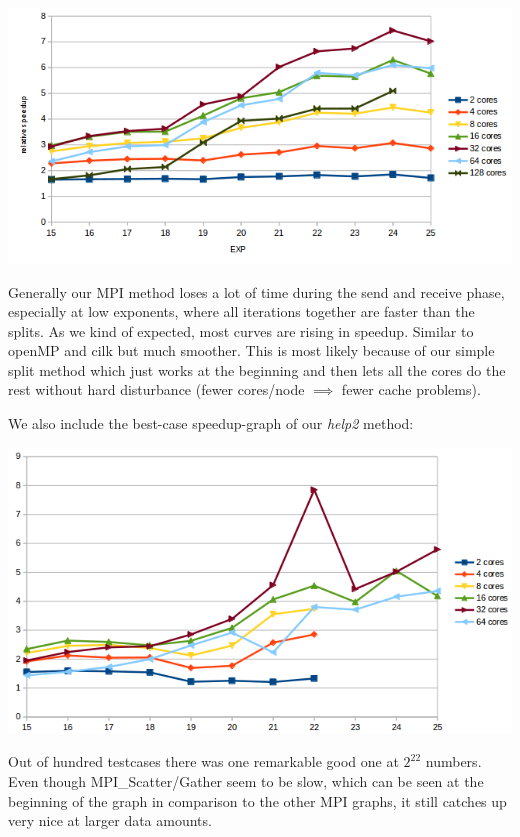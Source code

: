 \begin{center}
\includegraphics[width=\textwidth]{MPI_best}
\end{center}

Generally our MPI method loses a lot of time during the send and receive phase, especially at low exponents, where all iterations together are faster than the splits. As we kind of expected, most curves are rising in speedup. Similar to openMP and cilk but much smoother. This is most likely because of our simple split method which just works at the beginning and then lets all the cores do the rest without hard disturbance (fewer cores/node \(\implies\) fewer cache problems). \newline


We also include the best-case speedup-graph of our \textit{help2} method:
\begin{center}
\includegraphics[width=\textwidth]{MPI_help2}
\end{center}

Out of hundred testcases there was one remarkable good one at \(2^{22}\) numbers. Even though MPI\_Scatter/Gather seem to be slow, which can be seen at the beginning of the graph in comparison to the other MPI graphs, it still catches up very nice at larger data amounts.
   

